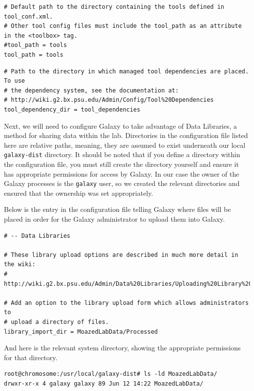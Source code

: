 \documentclass[a4paper,10pt]{article}
\begin{document}
\begin{lstlisting}
# Default path to the directory containing the tools defined in tool_conf.xml.
# Other tool config files must include the tool_path as an attribute in the <toolbox> tag.
#tool_path = tools
tool_path = tools
\end{lstlisting}

\begin{lstlisting}
# Path to the directory in which managed tool dependencies are placed.  To use
# the dependency system, see the documentation at:
# http://wiki.g2.bx.psu.edu/Admin/Config/Tool%20Dependencies
tool_dependency_dir = tool_dependencies
\end{lstlisting}

Next, we will need to configure Galaxy to take advantage of Data Libraries, a method for sharing data within the lab.  Directories in the configuration file listed here are relative paths, meaning, they are assumed to exist underneath our local \texttt{\footnotesize{galaxy-dist}} directory.  It should be noted that if you define a directory within the configuration file, you must still create the directory yourself and ensure it has appropriate permissions for access by Galaxy.  In our case the owner of the Galaxy processes is the \texttt{\footnotesize{galaxy}} user, so we created the relevant directories and ensured that the ownership was set appropriately.

Below is the entry in the configuration file telling Galaxy where files will be placed in order for the Galaxy administrator to upload them into Galaxy.

\begin{lstlisting}
# -- Data Libraries

# These library upload options are described in much more detail in the wiki:
# http://wiki.g2.bx.psu.edu/Admin/Data%20Libraries/Uploading%20Library%20Files

# Add an option to the library upload form which allows administrators to
# upload a directory of files.
library_import_dir = MoazedLabData/Processed
\end{lstlisting}

And here is the relevant system directory, showing the appropriate permissions for that directory.

\begin{lstlisting}
root@chromosome:/usr/local/galaxy-dist# ls -ld MoazedLabData/
drwxr-xr-x 4 galaxy galaxy 89 Jun 12 14:22 MoazedLabData/
\end{lstlisting}
\end{document}
